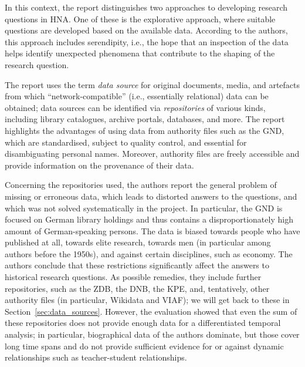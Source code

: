 In this context, the report distinguishes two approaches to developing research questions
in \gls{HNA}. One of these is the explorative approach,
where suitable questions are developed based on the available data.
According to the authors, this approach includes serendipity,
i.e., the hope that an inspection of the data helps identify unexpected
phenomena that contribute to the shaping of the research question.

The report uses the term \emph{data source} for original documents, media, and artefacts
from which \enquote{network-compatible} (i.e., essentially relational) data can be obtained;
data sources can be identified via \emph{repositories} of various kinds,
including library catalogues, archive portals, databases, and more.
The report highlights the advantages of using data from authority files
such as the \gls{GND}, which are standardised,
subject to quality control, and essential for disambiguating personal names.
Moreover, authority files are freely accessible and provide information
on the provenance of their data.

Concerning the repositories used,
the authors report the general problem of missing or erroneous data,
which leads to distorted answers to the questions, and which was not solved
systematically in the project. In particular, the \gls{GND} is focused on German library holdings
and thus contains a disproportionately high amount of German-speaking persons.
The data is biased towards people who have published at all,
towards elite research, towards men (in particular among authors before the 1950s),
and against certain disciplines, such as economy.
The authors conclude that these restrictions significantly affect the answers to
historical research questions. As possible remedies, they include 
further repositories, such as 
the \gls{ZDB},
the \gls{DNB},
the \gls{KPE},
%
and, tentatively, other authority files (in particular, Wikidata and \gls{VIAF});
we will get back to these in Section~\ref{sec:data_sources}.
However, the evaluation showed that even the sum of these repositories
does not provide enough data for a differentiated temporal
analysis; in particular, biographical data of the authors 
dominate, but those cover long time spans and do not provide sufficient evidence
for or against dynamic relationships such as teacher-student relationships.

